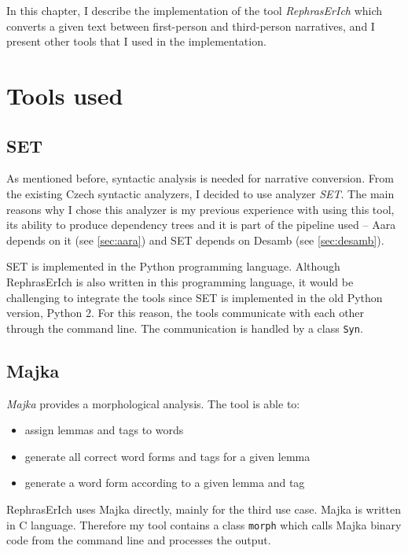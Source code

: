 In this chapter, I describe the implementation of the tool \emph{RephrasErIch} which converts a given text between first-person and third-person narratives, and I present other tools that I used in the implementation.

\section{Tools used} \label{sec:external-tools}

\subsection{SET}

As mentioned before, syntactic analysis is needed for narrative conversion. From the existing Czech syntactic analyzers, I decided to use analyzer \emph{SET}. The main reasons why I chose this analyzer is my previous experience with using this tool, its ability to produce dependency trees and it is part of the pipeline used -- Aara depends on it (see \ref{sec:aara}) and SET depends on Desamb (see \ref{sec:desamb}).

SET is implemented in the Python programming language. Although RephrasErIch is also written in this programming language, it would be challenging to integrate the tools since SET is implemented in the old Python version, Python 2. For this reason, the tools communicate with each other through the command line. The communication is handled by a class \texttt{Syn}.

\subsection{Majka}

\emph{Majka} \cite{majka} provides a morphological analysis. The tool is able to:
\begin{itemize}
	\item assign lemmas and tags to words
	\item generate all correct word forms and tags for a given lemma
	\item generate a word form according to a given lemma and tag
\end{itemize}

RephrasErIch uses Majka directly, mainly for the third use case. Majka is written in C language. Therefore my tool contains a class \texttt{morph} which calls Majka binary code from the command line and processes the output.

